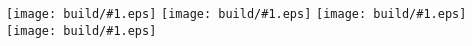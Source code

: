 \documentclass{article}
\newcommand{\Include}[1]{\texttt{[image: build/\#1.eps]}\vspace{1cm}}
\begin{document}
\centering

\Include{abend-wird-es-wieder}
\Include{kein-schoener-land}
\Include{wenn-alle-bruennlein-fliessen}
\Include{wenn-ich-ein-voeglein-waer}
\end{document}
